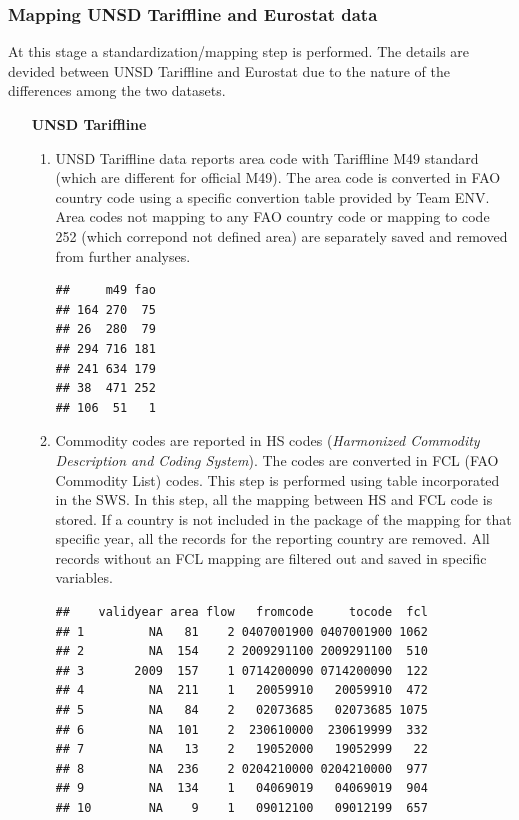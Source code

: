 \documentclass[nojss]{jss}\usepackage[]{graphicx}\usepackage[]{color}
\makeatletter
\newenvironment{kframe}{%
 \def\at@end@of@kframe{}%
 \ifinner\ifhmode%
  \def\at@end@of@kframe{\end{minipage}}%
  \begin{minipage}{\columnwidth}%
 \fi\fi%
 \def\FrameCommand##1{\hskip\@totalleftmargin \hskip-\fboxsep
 \colorbox{shadecolor}{##1}\hskip-\fboxsep
     \hskip-\linewidth \hskip-\@totalleftmargin \hskip\columnwidth}%
 \MakeFramed {\advance\hsize-\width
   \@totalleftmargin\z@ \linewidth\hsize
   \@setminipage}}%
 {\par\unskip\endMakeFramed%
 \at@end@of@kframe}
\newenvironment{knitrout}{}{} %
\makeatother
\begin{document}
\subsubsection{Mapping UNSD Tariffline and Eurostat data}
At this stage a standardization/mapping step is performed. The details are devided between UNSD Tariffline and Eurostat due to the nature of the differences among the two datasets.
\begin{itemize}
\item [\bf{UNSD Tariffline}]
\begin{enumerate}
\item UNSD Tariffline data reports area code with Tariffline M49 standard (which are different for official M49). The area code is converted in FAO country code using a specific convertion table provided by Team ENV. Area codes not mapping to any FAO country code or mapping to code 252 (which correpond not defined area) are separately saved and removed from further analyses.
\begin{knitrout}
\color{fgcolor}\begin{kframe}
\begin{verbatim}
##     m49 fao
## 164 270  75
## 26  280  79
## 294 716 181
## 241 634 179
## 38  471 252
## 106  51   1
\end{verbatim}
\end{kframe}
\end{knitrout}

\item Commodity codes are reported in HS codes ({\it Harmonized Commodity Description and Coding System}). The codes are converted in FCL (FAO Commodity List) codes. This step is performed using table incorporated in the SWS. In this step, all the mapping between HS and FCL code is stored. If a country is not included in the package of the mapping for that specific year, all the records for the reporting country are removed. All records without an FCL mapping are filtered out and saved in specific variables.
\begin{knitrout}
\color{fgcolor}\begin{kframe}
\begin{verbatim}
##    validyear area flow   fromcode     tocode  fcl
## 1         NA   81    2 0407001900 0407001900 1062
## 2         NA  154    2 2009291100 2009291100  510
## 3       2009  157    1 0714200090 0714200090  122
## 4         NA  211    1   20059910   20059910  472
## 5         NA   84    2   02073685   02073685 1075
## 6         NA  101    2  230610000  230619999  332
## 7         NA   13    2   19052000   19052999   22
## 8         NA  236    2 0204210000 0204210000  977
## 9         NA  134    1   04069019   04069019  904
## 10        NA    9    1   09012100   09012199  657
\end{verbatim}
\end{kframe}
\end{knitrout}



\end{enumerate}
\end{itemize}
\end{document}
